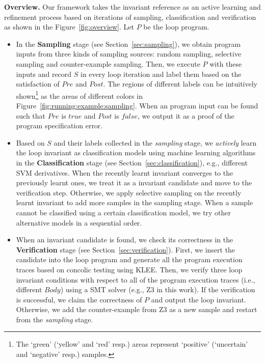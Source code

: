 \medskip\noindent
\textbf{Overview.}
Our framework takes the invariant reference as an active learning and refinement process 
based on iterations of sampling, classification and verification 
as shown in the Figure~\ref{fig:overview}. 
Let $P$ be the loop program. 
\begin{itemize}
    \item 
    In the \textbf{Sampling} stage (see Section~\ref{sec:sampling}), 
    we obtain program inputs from three kinds of sampling sources: 
    random sampling, selective sampling and counter-example sampling. 
    Then, we execute $P$ with these inputs and record $S$ in every loop iteration 
    and label them based on the satisfaction of $\mathit{Pre}$ and $\mathit{Post}$. 
    The regions of different labels can be intuitively shown\footnote{
        The `green' (`yellow' and `red' resp.) areas 
        represent `positive' (`uncertain' and `negative' resp.) samples. 
    } as the areas of different colors in Figure~\ref{fig:running:example:sampling}. 
    When an program input can be found such that 
    $\mathit{Pre}$ is $\mathit{true}$ and $\mathit{Post}$ is $\mathit{false}$, 
    we output it as a proof of the program specification error. 
    \item 
    Based on $S$ and their labels collected in the \emph{sampling} stage, 
    we \emph{actively} learn the loop invariant as classification models 
    using machine learning algorithms 
    in the \textbf{Classification} stage (see Section~\ref{sec:classification}), 
    e.g., different SVM derivatives. 
    When the recently learnt invariant converges to the previously learnt ones, 
    we treat it as a invariant candidate and move to the verification step. 
    Otherwise, we apply selective sampling on the recently learnt invariant 
    to add more samples in the sampling stage. 
    When a sample cannot be classified using a certain classification model, 
    we try other alternative models in a sequential order. 
    \item 
    When an invariant candidate is found, 
    we check its correctness in the \textbf{Verification} stage (see Section~\ref{sec:verification}). 
    First, we insert the candidate into the loop program and generate all the program execution traces 
    based on concolic testing using KLEE. 
    Then, we verify three loop invariant conditions 
    with respect to all of the program execution traces (i.e., different $\mathit{Body}$) 
    using a SMT solver (e.g., Z3 in this work). 
    If the verification is successful, we claim the correctness of $P$ and output the loop invariant. 
    Otherwise, we add the counter-example from Z3 as a new sample 
    and restart from the \emph{sampling} stage. 
\end{itemize}


